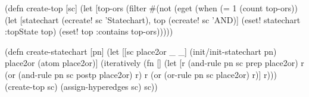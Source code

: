\documentclass[submission]{eptcs}
\begin{document}
\begin{clojurecode}
(defn create-top [sc]
  (let [top-ors (filter #(not (eget %
    (when (= 1 (count top-ors))
      (let [statechart (ecreate! sc 'Statechart), top (ecreate! sc 'AND)]
        (eset! statechart :topState top)
        (eset! top :contains top-ors)))))

(defn create-statechart [pn]
  (let [[sc place2or _ _] (init/init-statechart pn)
        place2or (atom place2or)]
    (iteratively (fn []
                   (let [r     (and-rule pn sc prep  place2or)
                         r (or (and-rule pn sc postp place2or) r)
                         r (or (or-rule  pn sc place2or)       r)]
                     r)))
    (create-top sc)
    (assign-hyperedges sc)
    sc))
\end{clojurecode}
\end{document}
